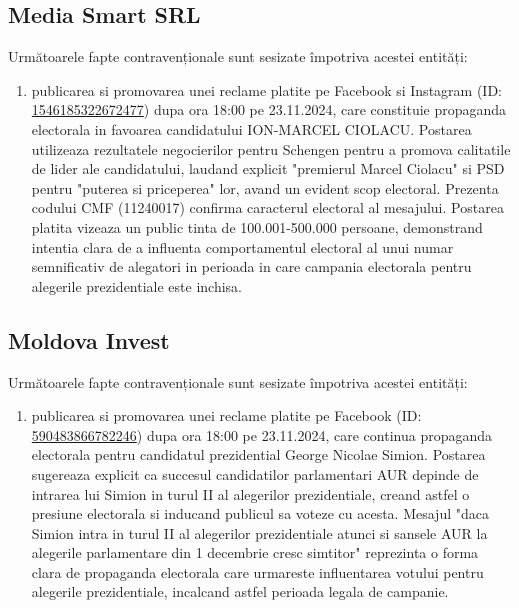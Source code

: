 \documentclass[a4paper,12pt]{article}
\begin{document}
\vspace{0.5cm}

\subsection{Media Smart SRL}
Următoarele fapte contravenționale sunt sesizate împotriva acestei entități:

\begin{enumerate}[leftmargin=*, label=\arabic*.)]
    \item publicarea si promovarea unei reclame platite pe Facebook si Instagram (ID: \href{https://www.facebook.com/ads/library/?id=1546185322672477}{1546185322672477}) dupa ora 18:00 pe 23.11.2024, care constituie propaganda electorala in favoarea candidatului ION-MARCEL CIOLACU. Postarea utilizeaza rezultatele negocierilor pentru Schengen pentru a promova calitatile de lider ale candidatului, laudand explicit "premierul Marcel Ciolacu" si PSD pentru "puterea si priceperea" lor, avand un evident scop electoral. Prezenta codului CMF (11240017) confirma caracterul electoral al mesajului. Postarea platita vizeaza un public tinta de 100.001-500.000 persoane, demonstrand intentia clara de a influenta comportamentul electoral al unui numar semnificativ de alegatori in perioada in care campania electorala pentru alegerile prezidentiale este inchisa.
\end{enumerate}

\vspace{0.5cm}

\subsection{Moldova Invest}
Următoarele fapte contravenționale sunt sesizate împotriva acestei entități:

\begin{enumerate}[leftmargin=*, label=\arabic*.)]
    \item publicarea si promovarea unei reclame platite pe Facebook (ID: \href{https://www.facebook.com/ads/library/?id=590483866782246}{590483866782246}) dupa ora 18:00 pe 23.11.2024, care continua propaganda electorala pentru candidatul prezidential George Nicolae Simion. Postarea sugereaza explicit ca succesul candidatilor parlamentari AUR depinde de intrarea lui Simion in turul II al alegerilor prezidentiale, creand astfel o presiune electorala si inducand publicul sa voteze cu acesta. Mesajul "daca Simion intra in turul II al alegerilor prezidentiale atunci si sansele AUR la alegerile parlamentare din 1 decembrie cresc simtitor" reprezinta o forma clara de propaganda electorala care urmareste influentarea votului pentru alegerile prezidentiale, incalcand astfel perioada legala de campanie.
\end{enumerate}
\end{document}
